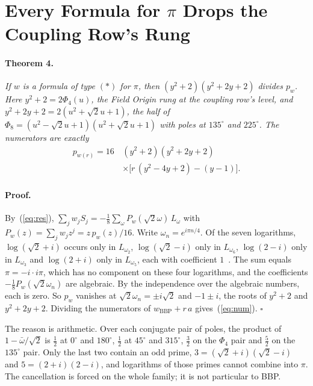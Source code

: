 \documentclass[twocolumn]{iopjournal}
\begin{document}

\section*{Every Formula for $\pi$ Drops the Coupling Row's Rung}

\paragraph{Theorem 4.} \textit{If $w$ is a formula of type $(\ast)$
for $\pi$, then $(y^2 + 2)(y^2 + 2y + 2)$ divides $p_w$. Here
$y^2 + 2 = 2\Phi_4(u)$, the Field Origin rung at the coupling row's
level, and $y^2 + 2y + 2 = 2(u^2 + \sqrt2 u + 1)$, the half of
$\Phi_8 = (u^2 - \sqrt2 u + 1)(u^2 + \sqrt2 u + 1)$ with poles at
$135^\circ$ and $225^\circ$. The numerators are exactly}
\begin{equation}
\begin{aligned}
  p_{w(r)} = 16\,&(y^2+2)(y^2+2y+2)\\
  &\times\big[r\,(y^2 - 4y + 2) - (y-1)\big].
\end{aligned}
  \label{eq:num}
\end{equation}

\paragraph{Proof.} By~(\ref{eq:res}),
$\sum_j w_j S_j = -\tfrac18\sum_\omega P_w(\sqrt2\omega)\,L_\omega$
with $P_w(z) = \sum_j w_j z^j = z\,p_w(z)/16$. Write
$\omega_n = e^{i\pi n/4}$. Of the seven logarithms,
$\log(\sqrt2 + i)$ occurs only in $L_{\omega_2}$,
$\log(\sqrt2 - i)$ only in $L_{\omega_6}$, $\log(2 - i)$ only in
$L_{\omega_3}$ and $\log(2 + i)$ only in $L_{\omega_5}$, each with
coefficient $1$~\cite{Nelson2026bbp}. The sum equals
$\pi = -i\cdot i\pi$, which has no component on these four
logarithms, and the coefficients $-\tfrac18 P_w(\sqrt2\omega_n)$ are
algebraic. By the independence over the algebraic numbers, each is
zero. So $p_w$ vanishes at $\sqrt2\omega_n = \pm i\sqrt2$ and
$-1 \pm i$, the roots of $y^2 + 2$ and $y^2 + 2y + 2$. Dividing the
numerators of $w_{\mathrm{BBP}} + r\,a$ gives~(\ref{eq:num}).
\hfill $\square$

\medskip
\noindent
The reason is arithmetic. Over each conjugate pair of poles, the
product of $1 - \bar\omega/\sqrt2$ is $\tfrac12$ at $0^\circ$ and
$180^\circ$, $\tfrac12$ at $45^\circ$ and $315^\circ$, $\tfrac32$ on
the $\Phi_4$ pair and $\tfrac52$ on the $135^\circ$ pair. Only the
last two contain an odd prime, $3 = (\sqrt2+i)(\sqrt2-i)$ and
$5 = (2+i)(2-i)$, and logarithms of those primes cannot combine into
$\pi$. The cancellation is forced on the whole family; it is not
particular to BBP.
\end{document}
